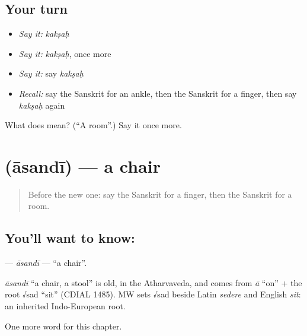 \subsection*{Your turn}
\begin{itemize}
\raggedright
  \item \emph{Say it:} \emph{kakṣaḥ}
  \item \emph{Say it:} \emph{kakṣaḥ}, once more
  \item \emph{Say it:} say \emph{kakṣaḥ}
  \item \emph{Recall:} say the Sanskrit for an ankle, then the Sanskrit for a finger, then say \emph{kakṣaḥ} again
\end{itemize}

\begin{tcolorbox}[breakable,colback=teal!4,colframe=teal!35!black,title={Before you move on}]
What does  mean? (\textquotedblleft{}A room\textquotedblright{}.) Say it once more.
\end{tcolorbox}
\section[\texorpdfstring{\sk{आसन्दी} (āsandī)}{आसन्दी (āsandī)}]{ (āsandī) — a chair}

\label{lesson:SA-C118-asandi}



\begin{quote}
Before the new one: say the Sanskrit for a finger, then the Sanskrit for a room.
\end{quote}

\subsection*{You'll want to know: }
\textbf{} — \emph{āsandī} — \textquotedblleft{}a chair\textquotedblright{}.

\begin{cousinweb}
\emph{āsandī} \textquotedblleft{}a chair, a stool\textquotedblright{} is old, in the Atharvaveda, and comes from \emph{ā} \textquotedblleft{}on\textquotedblright{} + the root √sad \textquotedblleft{}sit\textquotedblright{} (CDIAL 1485). MW sets √sad beside Latin \emph{sedere} and English \emph{sit}: an inherited Indo-European root.
\end{cousinweb}

\begin{grammarlens}[title={What you've built}]
One more word for this chapter.
\end{grammarlens}

